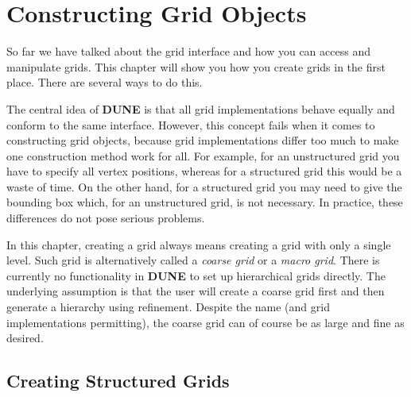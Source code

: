 \documentclass[11pt,a4paper,headinclude,footinclude,DIV16,normalheadings]{scrreprt}
\newcommand{\Dune}{{\sf\bfseries DUNE}\xspace}
\begin{document}
\chapter{Constructing Grid Objects}

So far we have talked about the grid interface and how you can access and
manipulate grids.  This chapter will show you how you create grids in the
first place.  There are several ways to do this.

The central idea of \Dune is that all grid implementations behave equally
and conform to the same interface.  However, this concept fails when it
comes to constructing grid objects, because grid implementations differ too
much to make one construction method work for all.  For example, for an
unstructured grid you have to specify all vertex positions, whereas for a
structured grid this would be a waste of time.  On the other hand, for
a structured grid you may need to give the bounding box which, for an
unstructured grid, is not necessary.  In practice, these differences do
not pose serious problems.

In this chapter, creating a grid always means creating a grid with only
a single level.  Such grid is alternatively called a {\em coarse grid}
or a {\em macro grid}.  There is currently no functionality in \Dune to
set up hierarchical grids directly.  The underlying assumption is that
the user will create a coarse grid first and then generate a hierarchy
using refinement.  Despite the name (and grid implementations permitting),
the coarse grid can of course be as large and fine as desired.

\section{Creating Structured Grids}
\end{document}
